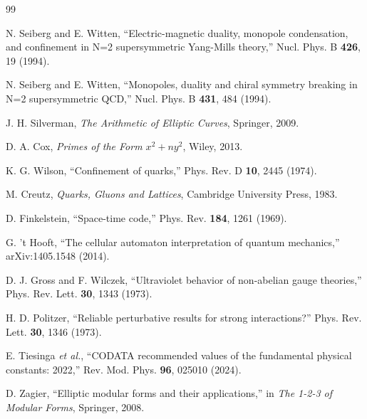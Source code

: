 \documentclass[11pt,a4paper]{article}
\theoremstyle{definition}
\theoremstyle{remark}
\begin{document}
\begin{thebibliography}{99}

N. Seiberg and E. Witten,
``Electric-magnetic duality, monopole condensation, and confinement in N=2 supersymmetric Yang-Mills theory,''
Nucl. Phys. B \textbf{426}, 19 (1994).

N. Seiberg and E. Witten,
``Monopoles, duality and chiral symmetry breaking in N=2 supersymmetric QCD,''
Nucl. Phys. B \textbf{431}, 484 (1994).

J. H. Silverman,
\textit{The Arithmetic of Elliptic Curves},
Springer, 2009.

D. A. Cox,
\textit{Primes of the Form $x^2 + ny^2$},
Wiley, 2013.

K. G. Wilson,
``Confinement of quarks,''
Phys. Rev. D \textbf{10}, 2445 (1974).

M. Creutz,
\textit{Quarks, Gluons and Lattices},
Cambridge University Press, 1983.

D. Finkelstein,
``Space-time code,''
Phys. Rev. \textbf{184}, 1261 (1969).

\begin{sloppypar}\raggedright
G. 't Hooft,
``The cellular automaton interpretation of quantum mechanics,''
arXiv:1405.1548 (2014).
\end{sloppypar}

D. J. Gross and F. Wilczek,
``Ultraviolet behavior of non-abelian gauge theories,''
Phys. Rev. Lett. \textbf{30}, 1343 (1973).

H. D. Politzer,
``Reliable perturbative results for strong interactions?''
Phys. Rev. Lett. \textbf{30}, 1346 (1973).

E. Tiesinga \textit{et al.},
``CODATA recommended values of the fundamental physical constants: 2022,''
Rev. Mod. Phys. \textbf{96}, 025010 (2024).

D. Zagier,
``Elliptic modular forms and their applications,''
in \textit{The 1-2-3 of Modular Forms}, Springer, 2008.


\end{thebibliography}
\end{document}
